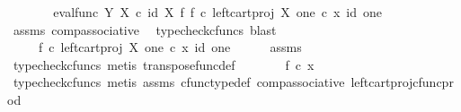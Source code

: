 \begin{isabellebody}
\ \ \isamarkupfalse%
\ \isamarkupfalse%
\ {\isachardoublequoteopen}{\isachardot}{\kern0pt}{\isachardot}{\kern0pt}{\isachardot}{\kern0pt}\ {\isacharequal}{\kern0pt}\ {\isacharparenleft}{\kern0pt}eval{\isacharunderscore}{\kern0pt}func\ Y\ X\ {\isasymcirc}\isactrlsub c\ {\isacharparenleft}{\kern0pt}id\ X\ {\isasymtimes}\isactrlsub f\ {\isacharparenleft}{\kern0pt}f\ {\isasymcirc}\isactrlsub c\ {\isacharparenleft}{\kern0pt}left{\isacharunderscore}{\kern0pt}cart{\isacharunderscore}{\kern0pt}proj\ X\ one{\isacharparenright}{\kern0pt}{\isacharparenright}{\kern0pt}\isactrlsup {\isasymsharp}{\isacharparenright}{\kern0pt}{\isacharparenright}{\kern0pt}\ {\isasymcirc}\isactrlsub c\ {\isasymlangle}x{\isacharcomma}{\kern0pt}\ id\ one{\isasymrangle}{\isachardoublequoteclose}\isanewline
\ \ \ \ \isamarkupfalse%
\ assms\ comp{\isacharunderscore}{\kern0pt}associative{}\ \isamarkupfalse%
\ {\isacharparenleft}{\kern0pt}typecheck{\isacharunderscore}{\kern0pt}cfuncs{\isacharcomma}{\kern0pt}\ blast{\isacharparenright}{\kern0pt}\isanewline
\ \ \isamarkupfalse%
\ \isamarkupfalse%
\ {\isachardoublequoteopen}{\isachardot}{\kern0pt}{\isachardot}{\kern0pt}{\isachardot}{\kern0pt}\ {\isacharequal}{\kern0pt}\ \ \ {\isacharparenleft}{\kern0pt}f\ {\isasymcirc}\isactrlsub c\ {\isacharparenleft}{\kern0pt}left{\isacharunderscore}{\kern0pt}cart{\isacharunderscore}{\kern0pt}proj\ X\ one{\isacharparenright}{\kern0pt}{\isacharparenright}{\kern0pt}\ {\isasymcirc}\isactrlsub c\ {\isasymlangle}x{\isacharcomma}{\kern0pt}\ id\ one{\isasymrangle}{\isachardoublequoteclose}\isanewline
\ \ \ \ \isamarkupfalse%
\ assms\ \isamarkupfalse%
\ {\isacharparenleft}{\kern0pt}typecheck{\isacharunderscore}{\kern0pt}cfuncs{\isacharcomma}{\kern0pt}\ metis\ transpose{\isacharunderscore}{\kern0pt}func{\isacharunderscore}{\kern0pt}def{\isacharparenright}{\kern0pt}\isanewline
\ \ \isamarkupfalse%
\ \isamarkupfalse%
\ {\isachardoublequoteopen}{\isachardot}{\kern0pt}{\isachardot}{\kern0pt}{\isachardot}{\kern0pt}\ {\isacharequal}{\kern0pt}\ f\ {\isasymcirc}\isactrlsub c\ x{\isachardoublequoteclose}\isanewline
\ \ \ \ \isamarkupfalse%
\ {\isacharparenleft}{\kern0pt}typecheck{\isacharunderscore}{\kern0pt}cfuncs{\isacharcomma}{\kern0pt}\ metis\ assms\ cfunc{\isacharunderscore}{\kern0pt}type{\isacharunderscore}{\kern0pt}def\ comp{\isacharunderscore}{\kern0pt}associative\ left{\isacharunderscore}{\kern0pt}cart{\isacharunderscore}{\kern0pt}proj{\isacharunderscore}{\kern0pt}cfunc{\isacharunderscore}{\kern0pt}prod{\isacharparenright}{\kern0pt}\isanewline

\end{isabellebody}
